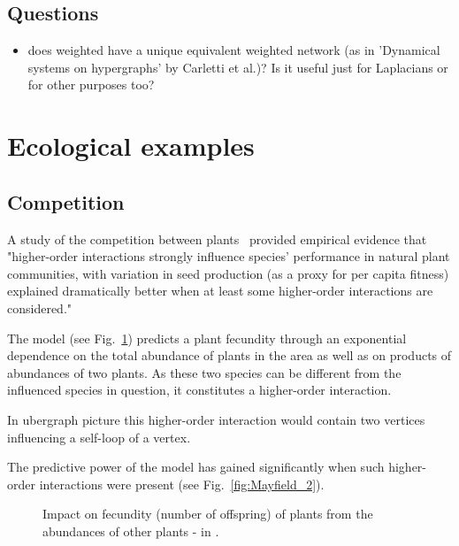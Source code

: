 \documentclass[a4paper,12pt]{article}
\theoremstyle{definition}
\theoremstyle{remark}
\begin{document}



\subsection{Questions}
\begin{itemize}
    \item does weighted have a unique equivalent weighted network (as in 'Dynamical systems on hypergraphs' by Carletti et al.)? Is it useful just for Laplacians or for other purposes too?
\end{itemize}







\section{Ecological examples}
\subsection{Competition}
A study of the competition between plants~\cite{Mayfield2017} provided empirical evidence that "higher-order interactions strongly influence species’ performance in natural plant communities, with variation in seed production (as a proxy for per capita fitness) explained
dramatically better when at least some higher-order interactions are considered."

The model (see Fig.~\ref{fig:Mayfield_1}) predicts a plant fecundity through an exponential dependence on the total abundance of plants in the area as well as on products of abundances of two plants. As these two species can be different from the influenced species in question, it constitutes a higher-order interaction. 

In ubergraph picture this higher-order interaction would contain two vertices influencing a self-loop of a vertex.

The predictive power of the model has gained significantly when such higher-order interactions were present (see Fig.~\ref{fig:Mayfield_2}).


\begin{figure}[h!]
	\begin{center}
        \caption{Impact on fecundity (number of offspring) of plants from the abundances of other plants - in \cite{Mayfield2017}.} 
    	\label{fig:Mayfield_1}
    \end{center}
    \end{figure}  
\end{document}
